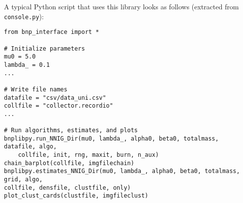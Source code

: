 A typical Python script that uses this library looks as follows (extracted from \verb|console.py|):
\begin{verbatim}
from bnp_interface import *

# Initialize parameters
mu0 = 5.0
lambda_ = 0.1
...

# Write file names
datafile = "csv/data_uni.csv"
collfile = "collector.recordio"
...

# Run algorithms, estimates, and plots
bnplibpy.run_NNIG_Dir(mu0, lambda_, alpha0, beta0, totalmass, datafile, algo,
    collfile, init, rng, maxit, burn, n_aux)
chain_barplot(collfile, imgfilechain)
bnplibpy.estimates_NNIG_Dir(mu0, lambda_, alpha0, beta0, totalmass, grid, algo,
collfile, densfile, clustfile, only)
plot_clust_cards(clustfile, imgfileclust)
\end{verbatim}
